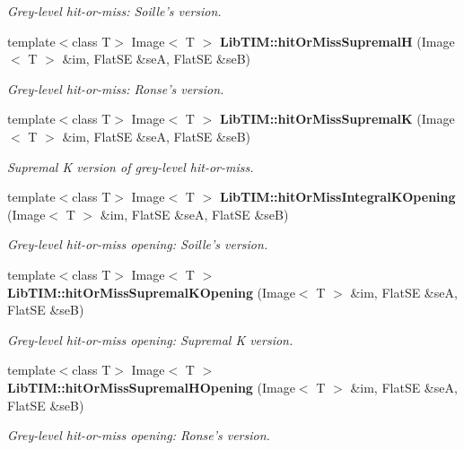 \begin{CompactItemize}
\begin{CompactList}\small\item\em Grey-level hit-or-miss: Soille's version. \item\end{CompactList}\item 
template$<$class T$>$ Image$<$ T $>$ {\bf Lib\-TIM::hit\-Or\-Miss\-Supremal\-H} (Image$<$ T $>$ \&im, Flat\-SE \&se\-A, Flat\-SE \&se\-B)
\begin{CompactList}\small\item\em Grey-level hit-or-miss: Ronse's version. \item\end{CompactList}\item 
template$<$class T$>$ Image$<$ T $>$ {\bf Lib\-TIM::hit\-Or\-Miss\-Supremal\-K} (Image$<$ T $>$ \&im, Flat\-SE \&se\-A, Flat\-SE \&se\-B)
\begin{CompactList}\small\item\em Supremal K version of grey-level hit-or-miss. \item\end{CompactList}\item 
template$<$class T$>$ Image$<$ T $>$ {\bf Lib\-TIM::hit\-Or\-Miss\-Integral\-KOpening} (Image$<$ T $>$ \&im, Flat\-SE \&se\-A, Flat\-SE \&se\-B)
\begin{CompactList}\small\item\em Grey-level hit-or-miss opening: Soille's version. \item\end{CompactList}\item 
template$<$class T$>$ Image$<$ T $>$ {\bf Lib\-TIM::hit\-Or\-Miss\-Supremal\-KOpening} (Image$<$ T $>$ \&im, Flat\-SE \&se\-A, Flat\-SE \&se\-B)
\begin{CompactList}\small\item\em Grey-level hit-or-miss opening: Supremal K version. \item\end{CompactList}\item 
template$<$class T$>$ Image$<$ T $>$ {\bf Lib\-TIM::hit\-Or\-Miss\-Supremal\-HOpening} (Image$<$ T $>$ \&im, Flat\-SE \&se\-A, Flat\-SE \&se\-B)
\begin{CompactList}\small\item\em Grey-level hit-or-miss opening: Ronse's version. \item\end{CompactList}\end{CompactItemize}
